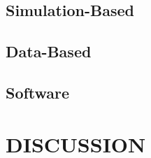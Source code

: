 \subsection{Simulation-Based}

\subsection{Data-Based}

\subsection{Software}



\section{\centering DISCUSSION}





\clearpage






